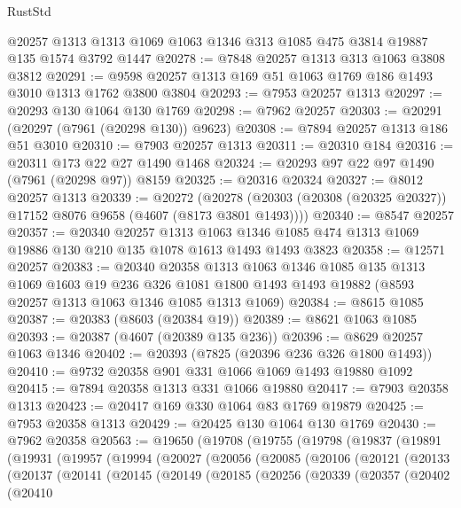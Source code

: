 \begin{lexlean}{RustStd}
\begin{coremodule}
    @20257
    @1313
    @1313
    @1069
    @1063
    @1346
    @313
    @1085
    @475
    @3814
    @19887
    @135
    @1574
    @3792
    @1447
@20278 := @7848 @20257 @1313 @313 @1063 @3808 @3812
@20291 := @9598 @20257 @1313 @169 @51 @1063 @1769 @186 @1493 @3010 @1313 @1762 @3800 @3804
@20293 := @7953 @20257 @1313
@20297 := @20293 @130 @1064 @130 @1769
@20298 := @7962 @20257
@20303 := @20291 (@20297 (@7961 (@20298 @130)) @9623)
@20308 := @7894 @20257 @1313 @186 @51 @3010
@20310 := @7903 @20257 @1313
@20311 := @20310 @184
@20316 := @20311 @173 @22 @27 @1490 @1468
@20324 := @20293 @97 @22 @97 @1490 (@7961 (@20298 @97)) @8159
@20325 := @20316 @20324
@20327 := @8012 @20257 @1313
@20339 := @20272
    (@20278 (@20303 (@20308 (@20325 @20327)) @17152 @8076 @9658 (@4607 (@8173 @3801 @1493))))
@20340 := @8547 @20257
@20357 := @20340
    @20257
    @1313
    @1063
    @1346
    @1085
    @474
    @1313
    @1069
    @19886
    @130
    @210
    @135
    @1078
    @1613
    @1493
    @1493
    @3823
@20358 := @12571 @20257
@20383 := @20340
    @20358
    @1313
    @1063
    @1346
    @1085
    @135
    @1313
    @1069
    @1603
    @19
    @236
    @326
    @1081
    @1800
    @1493
    @1493
    @19882
    (@8593 @20257 @1313 @1063 @1346 @1085 @1313 @1069)
@20384 := @8615 @1085
@20387 := @20383 (@8603 (@20384 @19))
@20389 := @8621 @1063 @1085
@20393 := @20387 (@4607 (@20389 @135 @236))
@20396 := @8629 @20257 @1063 @1346
@20402 := @20393 (@7825 (@20396 @236 @326 @1800 @1493))
@20410 := @9732 @20358 @901 @331 @1066 @1069 @1493 @19880 @1092
@20415 := @7894 @20358 @1313 @331 @1066 @19880
@20417 := @7903 @20358 @1313
@20423 := @20417 @169 @330 @1064 @83 @1769 @19879
@20425 := @7953 @20358 @1313
@20429 := @20425 @130 @1064 @130 @1769
@20430 := @7962 @20358
@20563 := @19650
    (@19708
      (@19755
        (@19798
          (@19837
            (@19891
              (@19931
                (@19957
                  (@19994
                    (@20027
                      (@20056
                        (@20085
                          (@20106
                            (@20121
                              (@20133
                                (@20137
                                  (@20141
                                    (@20145
                                      (@20149
                                        (@20185
                                          (@20256
                                            (@20339
                                              (@20357
                                                (@20402
                                                  (@20410

\end{coremodule}
\end{lexlean}
